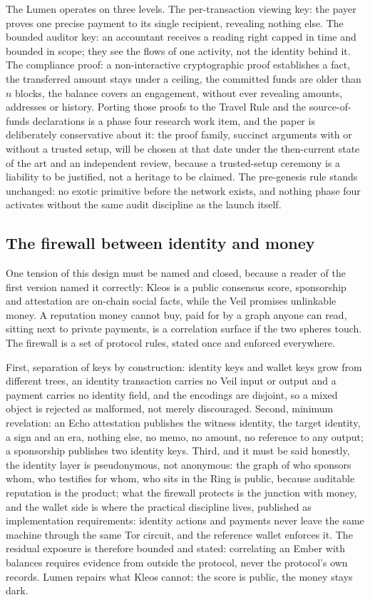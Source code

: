 The Lumen operates on three levels. The per-transaction viewing key: the
payer proves one precise payment to its single recipient, revealing
nothing else. The bounded auditor key: an accountant receives a reading
right capped in time and bounded in scope; they see the flows of one
activity, not the identity behind it. The compliance proof: a
non-interactive cryptographic proof establishes a fact, the transferred
amount stays under a ceiling, the committed funds are older than $n$
blocks, the balance covers an engagement, without ever revealing amounts,
addresses or history. Porting those proofs to the Travel Rule and the
source-of-funds declarations is a phase four research work item, and the
paper is deliberately conservative about it: the proof family, succinct
arguments with or without a trusted setup, will be chosen at that date
under the then-current state of the art and an independent review, because a
trusted-setup ceremony is a liability to be justified, not a heritage to
be claimed. The pre-genesis rule stands unchanged: no exotic primitive
before the network exists, and nothing phase four activates without the
same audit discipline as the launch itself.

\subsection{The firewall between identity and money}

One tension of this design must be named and closed, because a reader of
the first version named it correctly: Kleos is a public consensus score,
sponsorship and attestation are on-chain social facts, while the Veil
promises unlinkable money. A reputation money cannot buy, paid for by a
graph anyone can read, sitting next to private payments, is a
correlation surface if the two spheres touch. The firewall is a set of
protocol rules, stated once and enforced everywhere.

First, separation of keys by construction: identity keys and wallet keys
grow from different trees, an identity transaction carries no Veil input
or output and a payment carries no identity field, and the encodings are
disjoint, so a mixed object is rejected as malformed, not merely
discouraged. Second, minimum revelation: an Echo attestation publishes
the witness identity, the target identity, a sign and an era, nothing
else, no memo, no amount, no reference to any output; a sponsorship
publishes two identity keys. Third, and it must be said honestly, the
identity layer is pseudonymous, not anonymous: the graph of who
sponsors whom, who testifies for whom, who sits in the Ring is public,
because auditable reputation is the product; what the firewall protects
is the junction with money, and the wallet side is where the practical
discipline lives, published as implementation requirements: identity
actions and payments never leave the same machine through the same Tor
circuit, and the reference wallet enforces it. The residual exposure is
therefore bounded and stated: correlating an Ember with balances
requires evidence from outside the protocol, never the protocol's own
records. Lumen repairs what Kleos cannot: the score is public, the money
stays dark.

